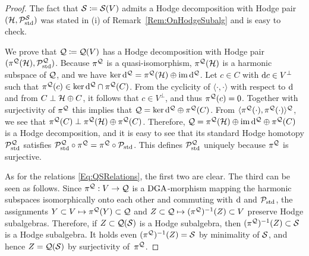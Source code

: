 \documentclass[\MainFolder/Text.tex]{subfiles}
\begin{document}
\begin{proof}
The fact that $\mathcal{S}\coloneqq\mathcal{S}(V)$ admits a Hodge decomposition with Hodge pair $(\mathcal{H},\mathcal{P}_{\mathrm{std}}^{\mathcal{S}})$ was stated in (i) of Remark~\ref{Rem:OnHodgeSubalg} and is easy to check.

We prove that $\mathcal{Q}\coloneqq \mathcal{Q}(V)$ has a Hodge decomposition with Hodge pair $(\pi^{\mathcal{Q}}(\mathcal{H}),\mathcal{P}_{\mathrm{std}}^{\mathcal{Q}})$. Because $\pi^{\mathcal{Q}}$ is a quasi-isomorphism, $\pi^{\mathcal{Q}}(\mathcal{H})$ is a harmonic subspace of $\mathcal{Q}$, and we have $\operatorname{ker} \mathrm{d}^{\mathcal{Q}} = \pi^{\mathcal{Q}}(\mathcal{H})\oplus \operatorname{im} \mathrm{d}^{\mathcal{Q}}$. Let $c\in C$ with $\mathrm{d} c \in V^\perp$ such that $\pi^{\mathcal{Q}}(c)\in\operatorname{ker}\mathrm{d}^{\mathcal{Q}} \cap \pi^{\mathcal{Q}}(C)$. From the cyclicity of $\langle\cdot,\cdot\rangle$ with respect to $\mathrm{d}$ and from $C\perp\mathcal{H}\oplus C$, it follows that $c\in V^\perp$, and thus $\pi^{\mathcal{Q}}(c)=0$. Together with surjectivity of $\pi^{\mathcal{Q}}$ this implies that $\mathcal{Q} = \ker \mathrm{d}^{\mathcal{Q}} \oplus \pi^{\mathcal{Q}}(C)$. From $\langle \pi^{\mathcal{Q}}(\cdot),\pi^{\mathcal{Q}}(\cdot)\rangle^{\mathcal{Q}}$, we see that $\pi^{\mathcal{Q}}(C) \perp \pi^{\mathcal{Q}}(\mathcal{H}) \oplus \pi^{\mathcal{Q}}(C)$. Therefore, $\mathcal{Q} = \pi^{\mathcal{Q}}(\mathcal{H})\oplus\operatorname{im}\mathrm{d}^{\mathcal{Q}}\oplus\pi^{\mathcal{Q}}(C)$ is a Hodge decomposition, and it is easy to see that its standard Hodge homotopy $\mathcal{P}_{\mathrm{std}}^{\mathcal{Q}}$ satisfies $\mathcal{P}_{\mathrm{std}}^{\mathcal{Q}} \circ \pi^{\mathcal{Q}}=\pi^{\mathcal{Q}}\circ \mathcal{P}_{\mathrm{std}}$. This defines $\mathcal{P}_{\mathrm{std}}^{\mathcal{Q}}$ uniquely because $\pi^{\mathcal{Q}}$ is surjective.

As for the relations \eqref{Eq:QSRelations}, the first two are clear. The third can be seen as follows. Since $\pi^{\mathcal{Q}}: V \rightarrow \mathcal{Q}$ is a $\mathrm{DGA}$-morphism mapping the harmonic subspaces isomorphically onto each other and commuting with $\mathrm{d}$ and $\mathcal{P}_{\mathrm{std}}$, the assignments $Y\subset V \mapsto \pi^{\mathcal{Q}}(Y)\subset \mathcal{Q}$ and $Z\subset \mathcal{Q} \mapsto (\pi^{\mathcal{Q}})^{-1}(Z)\subset V$ preserve Hodge subalgebras. Therefore, if $Z\subset \mathcal{Q}(\mathcal{S})$ is a Hodge subalgebra, then $(\pi^{\mathcal{Q}})^{-1}(Z)\subset\mathcal{S}$ is a Hodge subalgebra. It holds even $(\pi^{\mathcal{Q}})^{-1}(Z)=\mathcal{S}$ by minimality of $\mathcal{S}$, and hence $Z=\mathcal{Q}(\mathcal{S})$ by surjectivity of~$\pi^{\mathcal{Q}}$.  
\end{proof}

\end{document}
